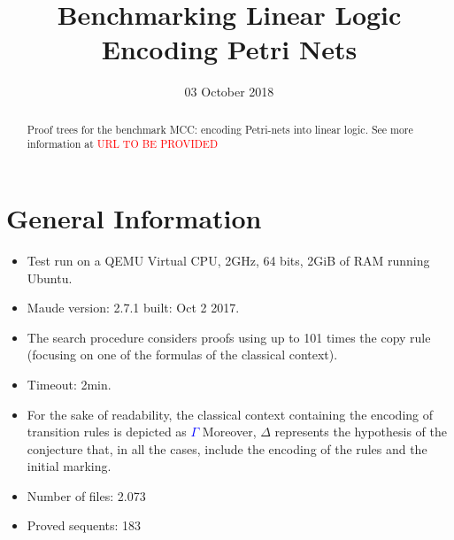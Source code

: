 \documentclass{article}
\title{Benchmarking Linear Logic\\ Encoding Petri Nets}
\date{03 October 2018}
\newcommand\red[1]{\textcolor{red}{#1}}
\newcommand\blue[2]{\textcolor{blue}{#1}}
\begin{document}
\maketitle
\begin{abstract}
Proof trees for the benchmark MCC: encoding Petri-nets into linear logic. See more information at
\red{{URL TO BE PROVIDED}}
\end{abstract}

\section{General Information}
\begin{itemize}
 \item Test run on a QEMU Virtual CPU, 2GHz, 64 bits, 2GiB of RAM running Ubuntu. 
\item Maude version: 2.7.1 built: Oct 2 2017.
\item The search procedure considers proofs  using up to 101 times the copy rule (focusing on one of the formulas of the classical context).
\item Timeout: 2min. 
\item For the sake of readability, the classical context containing the encoding of transition rules is depicted as \blue{$\Gamma$} . Moreover, $\Delta$ represents the hypothesis of the conjecture that, in all the cases, include the encoding of the rules and the initial marking. 
\item Number of files: 2.073
\item Proved sequents: 183 

\end{itemize}
\end{document}
